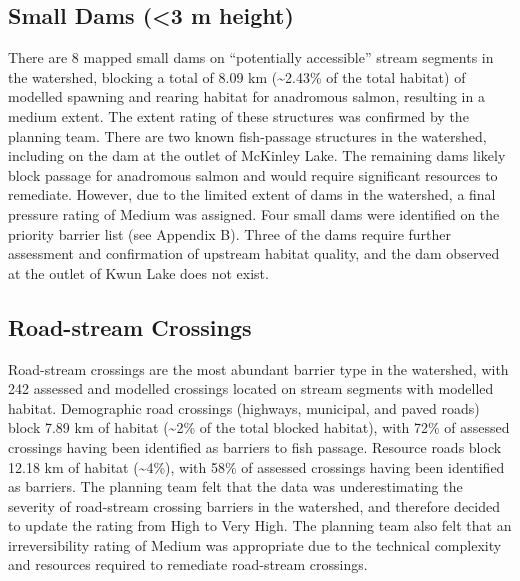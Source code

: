 \documentclass[
  letterpaper,
  DIV=11,
  numbers=noendperiod]{scrreprt}
\begin{document}
\hypertarget{small-dams-3-m-height}{%
\subsection*{Small Dams (\textless3 m
height)}\label{small-dams-3-m-height}}

There are 8 mapped small dams on ``potentially accessible'' stream
segments in the watershed, blocking a total of 8.09 km
(\textasciitilde2.43\% of the total habitat) of modelled spawning and
rearing habitat for anadromous salmon, resulting in a medium extent. The
extent rating of these structures was confirmed by the planning team.
There are two known fish-passage structures in the watershed, including
on the dam at the outlet of McKinley Lake. The remaining dams likely
block passage for anadromous salmon and would require significant
resources to remediate. However, due to the limited extent of dams in
the watershed, a final pressure rating of Medium was assigned. Four
small dams were identified on the priority barrier list (see Appendix
B). Three of the dams require further assessment and confirmation of
upstream habitat quality, and the dam observed at the outlet of Kwun
Lake does not exist.

\hypertarget{road-stream-crossings}{%
\subsection*{Road-stream Crossings}\label{road-stream-crossings}}

Road-stream crossings are the most abundant barrier type in the
watershed, with 242 assessed and modelled crossings located on stream
segments with modelled habitat. Demographic road crossings (highways,
municipal, and paved roads) block 7.89 km of habitat (\textasciitilde2\%
of the total blocked habitat), with 72\% of assessed crossings having
been identified as barriers to fish passage. Resource roads block 12.18
km of habitat (\textasciitilde4\%), with 58\% of assessed crossings
having been identified as barriers. The planning team felt that the data
was underestimating the severity of road-stream crossing barriers in the
watershed, and therefore decided to update the rating from High to Very
High. The planning team also felt that an irreversibility rating of
Medium was appropriate due to the technical complexity and resources
required to remediate road-stream crossings.
\end{document}
